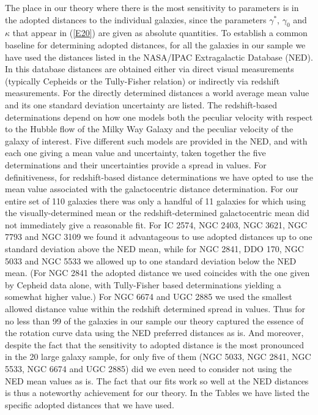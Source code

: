 \documentclass[preprint,aps]{revtex4}
\begin{document}
The place in our theory where there is the most sensitivity to parameters is in the adopted distances to the individual galaxies, since the parameters $\gamma^*$, $\gamma_0$ and $\kappa$ that appear in (\ref{E20}) are given as absolute quantities. To establish a common baseline for determining adopted distances, for all the galaxies in our sample we have used the distances listed in the NASA/IPAC Extragalactic Database (NED). In this database distances are obtained either via direct visual measurements (typically Cepheids or the Tully-Fisher relation) or indirectly via redshift measurements. For the directly determined distances a world average mean value and its one standard deviation uncertainty are listed. The redshift-based determinations depend on how one models both the peculiar velocity with respect to the Hubble flow of the Milky Way Galaxy and the peculiar velocity of the galaxy of interest. Five different such models are provided in the NED, and with each one giving a mean value and uncertainty, taken together the five determinations  and their uncertainties provide a spread in values.  For definitiveness, for redshift-based distance determinations we have opted to use the mean value associated with the galactocentric  distance determination. For our entire set of 110 galaxies there was only a handful of 11 galaxies for which using the visually-determined mean or the redshift-determined galactocentric mean did not immediately give a reasonable fit. For IC 2574, NGC 2403, NGC 3621, NGC 7793 and NGC 3109 we found it advantageous to use adopted distances up to one standard deviation above the NED mean, while for NGC 2841, DDO 170, NGC 5033 and NGC 5533 we allowed up to one standard deviation below the NED mean. (For NGC 2841 the adopted distance we used coincides with the one given by Cepheid data alone, with Tully-Fisher based determinations yielding a somewhat higher value.) For NGC 6674 and UGC 2885 we used the smallest allowed distance value within the redshift determined spread in values. Thus for no less than 99 of the galaxies in our sample our theory captured the essence of the rotation curve data using the NED preferred distances as is. And moreover, despite the fact that the sensitivity to adopted distance is the most pronounced in the 20 large galaxy sample, for only five of them (NGC 5033, NGC 2841, NGC 5533, NGC 6674 and UGC 2885) did we even need to consider not using the NED mean values as is. The fact that our fits work so well at the NED distances is thus a noteworthy achievement for our theory. In the Tables we have listed the specific adopted distances that we have used. 
\end{document}
